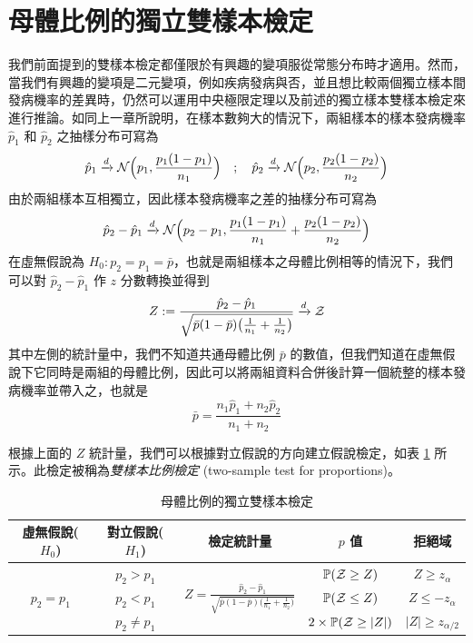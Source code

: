 \section{母體比例的獨立雙樣本檢定}
    我們前面提到的雙樣本檢定都僅限於有興趣的變項服從常態分布時才適用。然而，當我們有興趣的變項是二元變項，例如疾病發病與否，並且想比較兩個獨立樣本間發病機率的差異時，仍然可以運用中央極限定理以及前述的獨立樣本雙樣本檢定來進行推論。如同上一章所說明，在樣本數夠大的情況下，兩組樣本的樣本發病機率 $\hat{p}_1$ 和 $\hat{p}_2$ 之抽樣分布可寫為
    \smallskip
    \[\hat{p}_1 \xrightarrow[]{d} \mathcal{N}\Big(p_1, \frac{p_1(1-p_1)}{n_1}\Big) \quad ; \quad \hat{p}_2 \xrightarrow[]{d} \mathcal{N}\Big(p_2, \frac{p_2(1-p_2)}{n_2}\Big)\]
    \smallskip
    由於兩組樣本互相獨立，因此樣本發病機率之差的抽樣分布可寫為
    \smallskip
    \[\hat{p}_2 - \hat{p}_1 \xrightarrow[]{d} \mathcal{N}\Big(p_2 - p_1, \frac{p_1(1-p_1)}{n_1} + \frac{p_2(1-p_2)}{n_2}\Big)\]
    \smallskip
    在虛無假說為 $H_0 : p_2 = p_1 = \bar{p}$，也就是兩組樣本之母體比例相等的情況下，我們可以對 $\hat{p}_2 - \hat{p}_1$ 作 $z$ 分數轉換並得到
    \smallskip
    \[Z:=\frac{\hat{p}_2 - \hat{p}_1}{\sqrt{\bar{p}(1-\bar{p})\big(\frac{1}{n_1} + \frac{1}{n_2}\big)}} \xrightarrow[]{d} \mathcal{Z}\]
    \smallskip
    其中左側的統計量中，我們不知道共通母體比例 $\bar{p}$ 的數值，但我們知道在虛無假說下它同時是兩組的母體比例，因此可以將兩組資料合併後計算一個統整的樣本發病機率並帶入之，也就是
    \smallskip
    \[\bar{p} = \frac{n_1\hat{p}_1 + n_2\hat{p}_2}{n_1+n_2}\]

    \medskip
    
    根據上面的 $Z$ 統計量，我們可以根據對立假說的方向建立假說檢定，如表 \ref{tab:two_sample_proportion} 所示。此檢定被稱為\textit{雙樣本比例檢定} (two-sample test for proportions)。

    \begin{table}[htbp]
        \begin{center}
            \begin{tabular}{ccccc}
                \toprule
                虛無假說($H_0$) & 對立假說($H_1$) & 檢定統計量 & $p$ 值 & 拒絕域\\
                \hline
                \multirow{3}{*}{$p_2 = p_1$} & $p_2 > p_1$ & \multirow{3}{*}{$Z = \frac{\hat{p}_2-\hat{p}_1}{\sqrt{\bar{p}(1-\bar{p})\big(\frac{1}{n_1} + \frac{1}{n_2}\big)}}$} & $\mathbb{P}(\mathcal{Z} \ge Z)$ & $Z \ge z_{\alpha}$\\
                & $p_2 < p_1$ & &$\mathbb{P}(\mathcal{Z} \le Z)$&$Z \le -z_{\alpha}$\\
                & $p_2 \ne p_1$ & &$2\times\mathbb{P}(\mathcal{Z} \ge |Z|)$&$|Z| \ge z_{\alpha/2}$\\
                \bottomrule
            \end{tabular}
            \caption{母體比例的獨立雙樣本檢定\label{tab:two_sample_proportion}}
        \end{center}
    \end{table}


